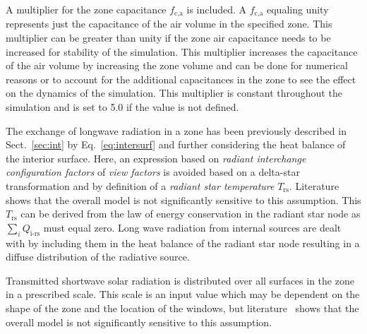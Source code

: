 A multiplier for the zone capacitance $f_{\textrm{c,a}}$ is included. A $f_{\textrm{c,a}}$ equaling unity represents just the capacitance of the air volume in the specified zone. This multiplier can be greater than unity if the zone air capacitance needs to be increased for stability of the simulation. This multiplier increases the capacitance of the air volume by increasing the zone volume and can be done for numerical reasons or to account for the additional capacitances in the zone to see the effect on the dynamics of the simulation. This multiplier is constant throughout the
simulation and is set to 5.0 if the value is not defined. %

The exchange of longwave radiation in a zone has been previously described in Sect.~\ref{sec:int} by Eq.~\ref{eq:intersurf} and further considering the heat balance of the interior surface. Here, an expression based on \emph{radiant interchange configuration factors} of \emph{view factors} is avoided based on a delta-star transformation and by definition of a \emph{radiant star temperature} $T_{\textrm{rs}}$. Literature~\cite{Liesen1997} shows that the overall model is not significantly sensitive to this assumption. This $T_{\textrm{rs}}$ can be derived from the law of energy conservation in the radiant star node as $\sum_{i}Q_{\textrm{i-rs}}$ must equal zero. Long wave radiation from internal sources are dealt with by including them in the heat balance of the radiant star node resulting in a diffuse distribution of the radiative source.

Transmitted shortwave solar radiation is distributed over all surfaces in the zone in a prescribed scale. This scale is an input value which may be dependent on the shape of the zone and the location of the windows, but literature~\cite{Liesen1997} shows that the overall model is not significantly sensitive to this assumption.

